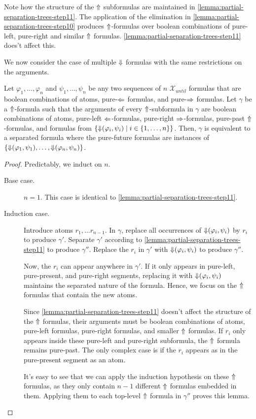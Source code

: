 \documentclass[a4paper,UKenglish,cleveref, autoref, thm-restate, numberwithinsect]{lipics-v2021}
\def\Larrow{\ensuremath\mathord{\Leftarrow}}
\def\Rarrow{\ensuremath\mathord{\Rightarrow}}
\def\Uarrow{\ensuremath\mathord{\Uparrow}}
\def\Darrow{\ensuremath\mathord{\Downarrow}}
\begin{document}
Note how the structure of the $\Uarrow$ subformulas are maintained in \cref{lemma:partial-separation-trees-step11}. The application of the elimination in \cref{lemma:partial-separation-trees-step10} produces $\Uarrow$-formulas over boolean combinations of pure-left, pure-right and similar $\Uarrow$ formulas. \cref{lemma:partial-separation-trees-step11} does't affect this.

We now consider the case of multiple $\Darrow$ formulas with the same restrictions on the arguments.
\begin{lemma}
    \label{lemma:partial-separation-trees-step12}
    Let $\varphi_1, \ldots, \varphi_n$ and $\psi_1, \ldots, \psi_n$ be any two sequences of $n$ $\mathcal{X}_{until}$ formulas that are boolean combinations of atoms, pure-$\Larrow$ formulas, and pure-$\Rarrow$ formulas. Let $\gamma$ be a $\Uarrow$-formula such that the arguments of every $\Uarrow$-subformula in $\gamma$ are boolean combinations of atoms, pure-left $\Larrow$-formulas, pure-right $\Rarrow$-formulas, pure-past $\Uarrow$-formulas, and formulas from $\{\Darrow(\varphi_i, \psi_i) \mid i \in \{1, \ldots, n\} \}$. Then, $\gamma$ is equivalent to a separated formula where the pure-future formulas are instances of $\{\Darrow(\varphi_1, \psi_1), \ldots, \Darrow(\varphi_n, \psi_n)\}$.
\end{lemma}
\begin{proof}
    Predictably, we induct on $n$.
    \begin{description}
        \item[Base case.] $n = 1$. This case is identical to \cref{lemma:partial-separation-trees-step11}.
        \item[Induction case.] Introduce atoms $r_1, \ldots r_{n-1}$. In $\gamma$, replace all occurrences of $\Darrow(\varphi_i, \psi_i)$ by $r_i$ to produce $\gamma'$. Separate $\gamma'$ according to \cref{lemma:partial-separation-trees-step11} to produce $\gamma''$. Replace the $r_i$ in $\gamma'$ with $\Darrow(\varphi_i, \psi_i)$ to produce $\gamma''$.

        Now, the $r_i$ can appear anywhere in $\gamma'$. If it only appears in pure-left, pure-present, and pure-right segments, replacing it with $\Darrow(\varphi_i, \psi_i)$ maintains the separated nature of the formula. Hence, we focus on the $\Uarrow$ formulas that contain the new atoms.

        Since \cref{lemma:partial-separation-trees-step11} doesn't affect the structure of the $\Uarrow$ formulas, their arguments must be boolean combinations of atoms, pure-left formulas, pure-right formulas, and smaller $\Uarrow$ formulas. If $r_i$ only appears inside these pure-left and pure-right subformula, the $\Uarrow$ formula remains pure-past. The only complex case is if the $r_i$ appears as in the pure-present segment as an atom.

        It's easy to see that we can apply the induction hypothesis on these $\Uarrow$ formulas, as they only contain $n-1$ different $\Uarrow$ formulas embedded in them. Applying them to each top-level $\Uarrow$ formula in $\gamma''$ proves this lemma.
    \end{description}
\end{proof}
\end{document}
